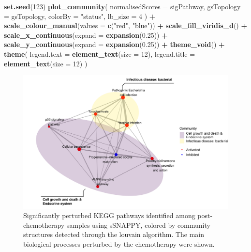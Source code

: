 \documentclass[9pt,a4paper,]{extarticle}
\newenvironment{Shaded}{\begin{snugshade}}{\end{snugshade}}
\newcommand{\AttributeTok}[1]{\textcolor[rgb]{0.13,0.29,0.53}{#1}}
\newcommand{\DecValTok}[1]{\textcolor[rgb]{0.00,0.00,0.81}{#1}}
\newcommand{\FloatTok}[1]{\textcolor[rgb]{0.00,0.00,0.81}{#1}}
\newcommand{\FunctionTok}[1]{\textcolor[rgb]{0.13,0.29,0.53}{\textbf{#1}}}
\newcommand{\NormalTok}[1]{#1}
\newcommand{\SpecialCharTok}[1]{\textcolor[rgb]{0.81,0.36,0.00}{\textbf{#1}}}
\newcommand{\StringTok}[1]{\textcolor[rgb]{0.31,0.60,0.02}{#1}}
\begin{document}
\begin{Shaded}
\begin{Highlighting}[]
\FunctionTok{set.seed}\NormalTok{(}\DecValTok{123}\NormalTok{)}
\FunctionTok{plot\_community}\NormalTok{(}
    \AttributeTok{normalisedScores =}\NormalTok{ sigPathway,}
    \AttributeTok{gsTopology =}\NormalTok{ gsTopology, }
    \AttributeTok{colorBy =} \StringTok{"status"}\NormalTok{,}
    \AttributeTok{lb\_size =} \DecValTok{4}
\NormalTok{) }\SpecialCharTok{+}
    \FunctionTok{scale\_colour\_manual}\NormalTok{(}\AttributeTok{values =} \FunctionTok{c}\NormalTok{(}\StringTok{"red"}\NormalTok{, }\StringTok{"blue"}\NormalTok{)) }\SpecialCharTok{+}
    \FunctionTok{scale\_fill\_viridis\_d}\NormalTok{() }\SpecialCharTok{+}
    \FunctionTok{scale\_x\_continuous}\NormalTok{(}\AttributeTok{expand =} \FunctionTok{expansion}\NormalTok{(}\FloatTok{0.25}\NormalTok{)) }\SpecialCharTok{+}
    \FunctionTok{scale\_y\_continuous}\NormalTok{(}\AttributeTok{expand =} \FunctionTok{expansion}\NormalTok{(}\FloatTok{0.25}\NormalTok{)) }\SpecialCharTok{+}
    \FunctionTok{theme\_void}\NormalTok{() }\SpecialCharTok{+}
    \FunctionTok{theme}\NormalTok{(}
        \AttributeTok{legend.text =} \FunctionTok{element\_text}\NormalTok{(}\AttributeTok{size =} \DecValTok{12}\NormalTok{),}
        \AttributeTok{legend.title =} \FunctionTok{element\_text}\NormalTok{(}\AttributeTok{size =} \DecValTok{12}\NormalTok{)}
\NormalTok{    )}
\end{Highlighting}
\end{Shaded}

\begin{figure}

{\centering \includegraphics[width=0.8\linewidth]{sSNAPPY_paper_files/figure-latex/Figure5-1} 

}

\caption{Significantly perturbed KEGG pathways identified among post-chemotherapy samples using sSNAPPY, colored by community structures detected through the louvain algorithm. The main biological processes perturbed by the chemotherapy were shown.}\label{fig:Figure5}
\end{figure}
\end{document}
